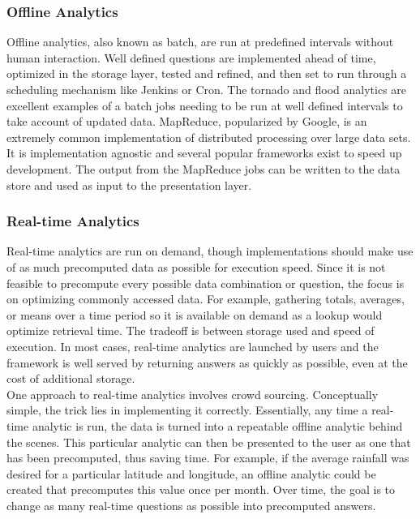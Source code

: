 \subsubsection{Offline Analytics}
Offline analytics, also known as batch, are run at predefined intervals without human interaction. Well defined questions are implemented ahead of time, optimized in the storage layer, tested and refined, and then set to run through a scheduling mechanism like Jenkins or Cron. The tornado and flood analytics are excellent examples of a batch jobs needing to be run at well defined intervals to take account of updated data. MapReduce, popularized by Google, is an extremely common implementation of distributed processing over large data sets. It is implementation agnostic and several popular frameworks exist to speed up development. The output from the MapReduce jobs can be written to the data store and used as input to the presentation layer.
\subsubsection{Real-time Analytics}
Real-time analytics are run on demand, though implementations should make use of as much precomputed data as possible for execution speed. Since it is not feasible to precompute every possible data combination or question, the focus is on optimizing commonly accessed data. For example, gathering totals, averages, or means over a time period so it is available on demand as a lookup would optimize retrieval time. The tradeoff is between storage used and speed of execution. In most cases, real-time analytics are launched by users and the framework is well served by returning answers as quickly as possible, even at the cost of additional storage.\\

One approach to real-time analytics involves crowd sourcing. Conceptually simple, the trick lies in implementing it correctly. Essentially, any time a real-time analytic is run, the data is turned into a repeatable offline analytic behind the scenes. This particular analytic can then be presented to the user as one that has been precomputed, thus saving time. For example, if the average rainfall was desired for a particular latitude and longitude, an offline analytic could be created that precomputes this value once per month. Over time, the goal is to change as many real-time questions as possible into precomputed answers.
